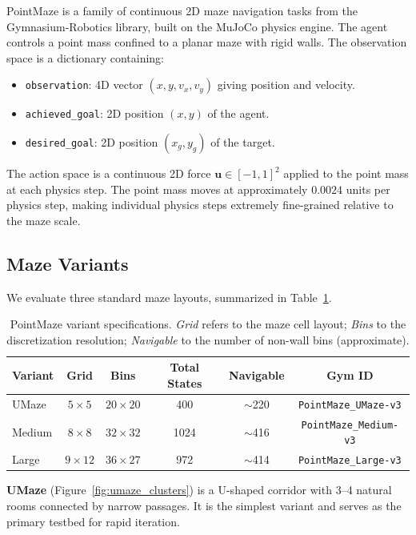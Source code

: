 \documentclass[11pt,a4paper]{article}
\begin{document}
PointMaze is a family of continuous 2D maze navigation tasks from the Gymnasium-Robotics library, built on the MuJoCo physics engine.
The agent controls a point mass confined to a planar maze with rigid walls.
The observation space is a dictionary containing:
\begin{itemize}[noitemsep]
    \item \texttt{observation}: 4D vector $(x, y, v_x, v_y)$ giving position and velocity.
    \item \texttt{achieved\_goal}: 2D position $(x, y)$ of the agent.
    \item \texttt{desired\_goal}: 2D position $(x_g, y_g)$ of the target.
\end{itemize}
The action space is a continuous 2D force $\mathbf{u} \in [-1, 1]^2$ applied to the point mass at each physics step.
The point mass moves at approximately $0.0024$ units per physics step, making individual physics steps extremely fine-grained relative to the maze scale.

\subsection{Maze Variants}
\label{sec:maze_variants}

We evaluate three standard maze layouts, summarized in Table~\ref{tab:maze_variants}.

\begin{table}[ht]
\centering
\caption{PointMaze variant specifications. \emph{Grid} refers to the maze cell layout; \emph{Bins} to the discretization resolution; \emph{Navigable} to the number of non-wall bins (approximate).}
\label{tab:maze_variants}
\begin{tabular}{lccccc}
\toprule
\textbf{Variant} & \textbf{Grid} & \textbf{Bins} & \textbf{Total States} & \textbf{Navigable} & \textbf{Gym ID} \\
\midrule
UMaze  & $5 \times 5$   & $20 \times 20$ & 400  & $\sim$220 & \texttt{PointMaze\_UMaze-v3} \\
Medium & $8 \times 8$   & $32 \times 32$ & 1024 & $\sim$416 & \texttt{PointMaze\_Medium-v3} \\
Large  & $9 \times 12$  & $36 \times 27$ & 972  & $\sim$414 & \texttt{PointMaze\_Large-v3} \\
\bottomrule
\end{tabular}
\end{table}

\textbf{UMaze} (Figure~\ref{fig:umaze_clusters}) is a U-shaped corridor with 3--4 natural rooms connected by narrow passages.
It is the simplest variant and serves as the primary testbed for rapid iteration.
\end{document}
